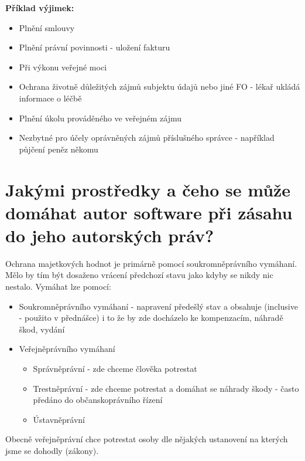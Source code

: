 \newpage 
\noindent\textbf{Příklad výjimek:}
\begin{itemize}[noitemsep]
    \item Plnění smlouvy
    \item Plnění právní povinnosti - uložení fakturu
    \item Při výkonu veřejné moci
    \item Ochrana životně důležitých zájmů subjektu údajů nebo jiné FO - lékař ukládá informace o léčbě
    \item Plnění úkolu prováděného ve veřejném zájmu
    \item Nezbytné pro účely oprávněných zájmů příslušného správce - například půjčení peněz někomu 
\end{itemize}

\vspace{0.3cm} \section{Jakými prostředky a čeho se může domáhat autor software při zásahu do jeho autorských práv?}

Ochrana majetkových hodnot je primárně pomocí soukromněprávního vymáhaní. Mělo by tím být dosaženo vrácení předchozí stavu jako kdyby se nikdy nic nestalo.\newline
Vymáhat lze pomocí:
\begin{itemize}[noitemsep]
    \item Soukromněprávního vymáhaní - napravení předešlý stav a obsahuje (inclusive - použito v přednášce) i to že by zde docházelo ke kompenzacím, náhradě škod, vydání
    \item Veřejněprávního vymáhaní
    \begin{itemize}[noitemsep]
        \item Správněprávní - zde chceme člověka potrestat 
        \item Trestněprávní - zde chceme potrestat a domáhat se náhrady škody - často předáno do občanskoprávního řízení
        \item Ústavněprávní
    \end{itemize}
\end{itemize}

Obecně veřejněprávní chce potrestat osoby dle nějakých ustanovení na kterých jsme se dohodly (zákony).

